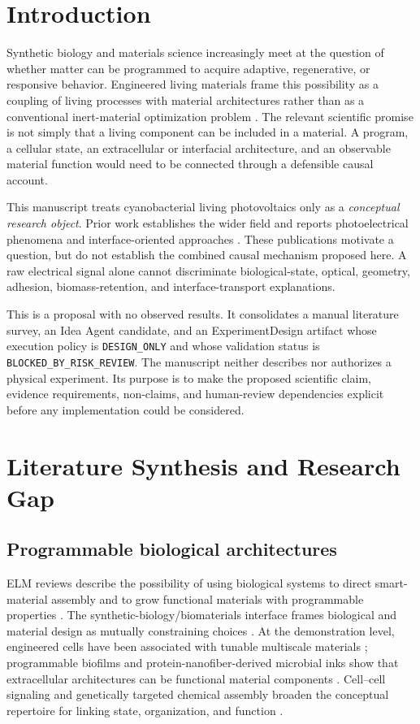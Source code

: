 \documentclass[conference]{IEEEtran}
\begin{document}
\section{Introduction}

Synthetic biology and materials science increasingly meet at the question of whether matter can be programmed to acquire adaptive, regenerative, or responsive behavior. Engineered living materials frame this possibility as a coupling of living processes with material architectures rather than as a conventional inert-material optimization problem \cite{nguyen2018,gilbert2019,liu2022}. The relevant scientific promise is not simply that a living component can be included in a material. A program, a cellular state, an extracellular or interfacial architecture, and an observable material function would need to be connected through a defensible causal account.

This manuscript treats cyanobacterial living photovoltaics only as a \emph{conceptual research object}. Prior work establishes the wider field and reports photoelectrical phenomena and interface-oriented approaches \cite{schuergers2017,saper2018,zhu2019,reggente2024,chen2025}. These publications motivate a question, but do not establish the combined causal mechanism proposed here. A raw electrical signal alone cannot discriminate biological-state, optical, geometry, adhesion, biomass-retention, and interface-transport explanations.

This is a proposal with no observed results. It consolidates a manual literature survey, an Idea Agent candidate, and an ExperimentDesign artifact whose execution policy is \texttt{DESIGN\_ONLY} and whose validation status is \texttt{BLOCKED\_BY\_RISK\_REVIEW}. The manuscript neither describes nor authorizes a physical experiment. Its purpose is to make the proposed scientific claim, evidence requirements, non-claims, and human-review dependencies explicit before any implementation could be considered.

\section{Literature Synthesis and Research Gap}

\subsection{Programmable biological architectures}

ELM reviews describe the possibility of using biological systems to direct smart-material assembly and to grow functional materials with programmable properties \cite{nguyen2018,gilbert2019}. The synthetic-biology/biomaterials interface frames biological and material design as mutually constraining choices \cite{liu2022}. At the demonstration level, engineered cells have been associated with tunable multiscale materials \cite{chen2014}; programmable biofilms and protein-nanofiber-derived microbial inks show that extracellular architectures can be functional material components \cite{huang2019,durajthatte2021}. Cell--cell signaling and genetically targeted chemical assembly broaden the conceptual repertoire for linking state, organization, and function \cite{toda2018,liu2020}.
\end{document}

